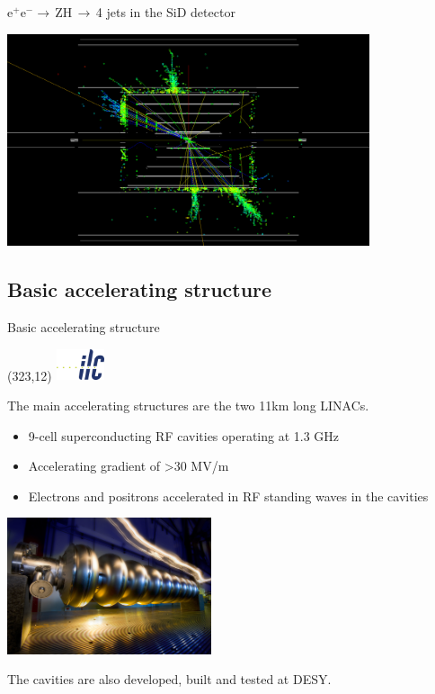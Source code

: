 \documentclass[xcolor={dvipsnames}]{beamer}
\newcommand{\ilclogo}{
  \setlength{\TPHorizModule}{1pt}
  \setlength{\TPVertModule}{1pt}
  \begin{textblock}{1}(323,12)
   \includegraphics[width=40pt,height=26pt]{figures/ILC.jpeg}
  \end{textblock}
}
\begin{document}
\begin{frame}[label=ZH_event_display]{e$^+$e$^-\rightarrow$\,ZH\,$\rightarrow$\,4 jets in the SiD detector}
 \begin{center}
   \includegraphics[width=0.8\textwidth]{figures/Zhiggs_4jets_SiD.png}\\
 \hyperlink{HitsEcalEndcaps}{}
 \end{center}
\end{frame}


\subsection{Basic accelerating structure}
\begin{frame}{Basic accelerating structure}
\ilclogo
The main accelerating structures are the two 11km long LINACs.
\begin{itemize}
\item 9-cell superconducting RF cavities operating at 1.3 GHz 
\item Accelerating gradient of >30 MV/m
\item Electrons and positrons accelerated in RF standing waves in the cavities 
\end{itemize}
\begin{center}
\includegraphics[width=0.45\textwidth]{figures/cavity.jpg}
\end{center}
The cavities are also developed, built and tested at DESY.
\end{frame}
\end{document}
